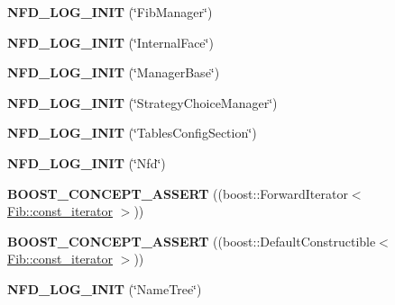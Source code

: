\begin{DoxyCompactItemize}
\item 
{\bfseries N\+F\+D\+\_\+\+L\+O\+G\+\_\+\+I\+N\+IT} (\char`\"{}Fib\+Manager\char`\"{})\hypertarget{namespacenfd_a7b70535a6efb30f50d6f3372b69e281f}{}\label{namespacenfd_a7b70535a6efb30f50d6f3372b69e281f}

\item 
{\bfseries N\+F\+D\+\_\+\+L\+O\+G\+\_\+\+I\+N\+IT} (\char`\"{}Internal\+Face\char`\"{})\hypertarget{namespacenfd_a49e0da56bb421572693a0b4a6d79266f}{}\label{namespacenfd_a49e0da56bb421572693a0b4a6d79266f}

\item 
{\bfseries N\+F\+D\+\_\+\+L\+O\+G\+\_\+\+I\+N\+IT} (\char`\"{}Manager\+Base\char`\"{})\hypertarget{namespacenfd_ad618726a5a71d65b141ed274947a02f6}{}\label{namespacenfd_ad618726a5a71d65b141ed274947a02f6}

\item 
{\bfseries N\+F\+D\+\_\+\+L\+O\+G\+\_\+\+I\+N\+IT} (\char`\"{}Strategy\+Choice\+Manager\char`\"{})\hypertarget{namespacenfd_a99c0e71af3379163054428a6b3d2bd9a}{}\label{namespacenfd_a99c0e71af3379163054428a6b3d2bd9a}

\item 
{\bfseries N\+F\+D\+\_\+\+L\+O\+G\+\_\+\+I\+N\+IT} (\char`\"{}Tables\+Config\+Section\char`\"{})\hypertarget{namespacenfd_a715ea6bf107a74186f75dd3ccf11588d}{}\label{namespacenfd_a715ea6bf107a74186f75dd3ccf11588d}

\item 
{\bfseries N\+F\+D\+\_\+\+L\+O\+G\+\_\+\+I\+N\+IT} (\char`\"{}Nfd\char`\"{})\hypertarget{namespacenfd_a32efdfd5a1e19b79306093ebcfc7c090}{}\label{namespacenfd_a32efdfd5a1e19b79306093ebcfc7c090}

\item 
{\bfseries B\+O\+O\+S\+T\+\_\+\+C\+O\+N\+C\+E\+P\+T\+\_\+\+A\+S\+S\+E\+RT} ((boost\+::\+Forward\+Iterator$<$ \hyperlink{classnfd_1_1Fib_1_1const__iterator}{Fib\+::const\+\_\+iterator} $>$))\hypertarget{namespacenfd_a4145971468f602a4f014b24a27cb6c24}{}\label{namespacenfd_a4145971468f602a4f014b24a27cb6c24}

\item 
{\bfseries B\+O\+O\+S\+T\+\_\+\+C\+O\+N\+C\+E\+P\+T\+\_\+\+A\+S\+S\+E\+RT} ((boost\+::\+Default\+Constructible$<$ \hyperlink{classnfd_1_1Fib_1_1const__iterator}{Fib\+::const\+\_\+iterator} $>$))\hypertarget{namespacenfd_ab338d4f6eb38fc1cbe01e3aca17a88dd}{}\label{namespacenfd_ab338d4f6eb38fc1cbe01e3aca17a88dd}

\item 
{\bfseries N\+F\+D\+\_\+\+L\+O\+G\+\_\+\+I\+N\+IT} (\char`\"{}Name\+Tree\char`\"{})\hypertarget{namespacenfd_a40234b86b7e4e7d899ddb5d4e6d11f90}{}\label{namespacenfd_a40234b86b7e4e7d899ddb5d4e6d11f90}


\end{DoxyCompactItemize}
